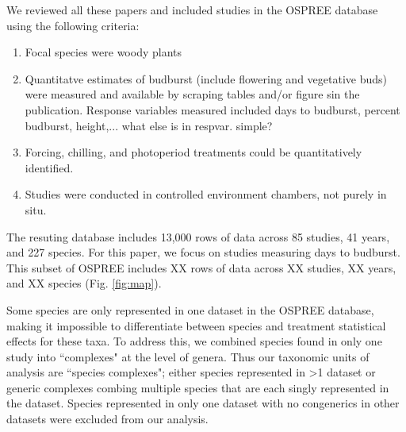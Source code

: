 \documentclass{article}
\begin{document}
We reviewed all these papers and included studies in the OSPREE database using the following criteria:
\begin{enumerate}
\item Focal species were woody plants
\item Quantitatve estimates of budburst (include flowering and vegetative buds) were measured and available by scraping tables and/or figure sin the publication. Response variables measured included days to budburst, percent budburst, height,... what else is in respvar. simple?
\item Forcing, chilling, and photoperiod treatments could be quantitatively identified.
\item Studies were conducted in controlled environment chambers, not purely in situ. 
\end{enumerate}
The resuting database includes 13,000 rows of data across 85 studies, 41 years, and 227 species. For this paper, we focus on studies measuring days to budburst. This subset of OSPREE includes XX rows of data across XX studies, XX years, and XX species (Fig. \ref{fig:map}).
\par Some species are only represented in one dataset in the OSPREE database, making it impossible to differentiate between species and treatment statistical effects for these taxa. To address this, we combined species found in only one study into ``complexes" at the level of genera. Thus our taxonomic units of analysis are ``species complexes"; either species represented in >1 dataset or generic complexes combing multiple species that are each singly represented in the dataset. Species represented in only one dataset with no congenerics in other datasets were excluded from our analysis.
\end{document}
